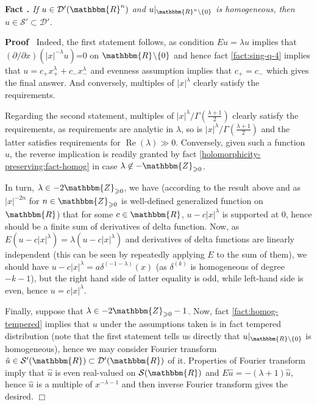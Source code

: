 \documentclass{article}
\newcommand{\nin}{\not\in}
\newcommand{\tmop}[1]{\ensuremath{\operatorname{#1}}}
\newcommand{\tmtextbf}[1]{{\bfseries{#1}}}
\newcommand{\tmtextit}[1]{{\itshape{#1}}}
\newcommand{\tmtextup}[1]{{\upshape{#1}}}
\newenvironment{proof}{\noindent\textbf{Proof\ }}{\hspace*{\fill}$\Box$\medskip}
\numberwithin{definition}{section}
\numberwithin{lemma}{section}
\numberwithin{proposition}{section}
{\theorembodyfont{\rmfamily}\newtheorem{remark}{Remark}
\numberwithin{remark}{section}
}
\begin{document}
{\noindent}\tmtextbf{Fact \tmtextup{15}.
}\tmtextit{\label{fact:homog-tempered}{\cite[thm.
7.1.18]{hormander1983analysis}} If $u \in \mathcal{D}' ( \mathbbm{R}^n)$ and
$u |_{\mathbbm{R}^n \backslash \{ 0 \}}$ is homogeneous, then $u \in
\mathcal{S}' \subset \mathcal{D}'$.}{\hspace*{\fill}}{\medskip}

\begin{proof}
  Indeed, the first statement follows, as condition $E u = \lambda u$ implies
  that $( \partial / \partial x) ( | x |^{- \lambda} u)$=0 on $\mathbbm{R}^{}
  \backslash \{ 0 \}$ and hence fact \ref{fact:sing-q-4} implies that $u = c_+
  x_+^{\lambda} + c_- x_-^{\lambda}$ and evenness assumption implies that $c_+
  = c_-$ which gives the final answer. And conversely, multiples of $| x
  |^{\lambda}$ clearly satisfy the requirements.
  
  Regarding the second statement, multiples of $| x |^{\lambda} / \Gamma
  \left( \frac{\lambda + 1}{2} \right)$ clearly satisfy the requirements, as
  requirements are analytic in $\lambda$, so is $| x |^{\lambda} / \Gamma
  \left( \frac{\lambda + 1}{2} \right)$ and the latter satisfies requirements
  for $\tmop{Re} ( \lambda) \gg 0$. Conversely, given such a function $u$, the
  reverse implication is readily granted by fact
  \ref{holomorphicity-preserving:fact-homog} in case $\lambda \nin
  -\mathbbm{Z}_{\geqslant 0}$.
  
  In turn, $\lambda \in - 2\mathbbm{Z}_{\geqslant 0}$, we have (according to
  the result above and as $| x |^{- 2 n}$ for $n \in \mathbbm{Z}_{\geqslant
  0}$ is well-defined generalized function on $\mathbbm{R}$) that for some $c
  \in \mathbbm{R}$, $u - c | x |^{\lambda}$ is supported at $0$, hence should
  be a finite sum of derivatives of delta function. Now, as $E ( u - c | x
  |^{\lambda}) = \lambda ( u - c | x |^{\lambda})$ and derivatives of delta
  functions are linearly independent (this can be seen by repeatedly applying
  $E$ to the sum of them), we should have $u - c | x |^{\lambda} = a \delta^{(
  - 1 - \lambda)} ( x)$ (as $\delta^{( k)}$ is homogeneous of degree $- k -
  1$), but the right hand side of latter equality is odd, while left-hand side
  is even, hence $u = c | x |^{\lambda}$.
  
  Finally, suppose that $\lambda \in - 2\mathbbm{Z}_{\geqslant 0} - 1$. Now,
  fact \ref{fact:homog-tempered} implies that $u$ under the assumptions taken
  is in fact tempered distribution (note that the first statement tells us
  directly that $u |_{\mathbbm{R}\backslash \{ 0 \}}$ is homogeneous), hence
  we may consider Fourier transform $\hat{u} \in \mathcal{S}' ( \mathbbm{R})
  \subset \mathcal{D}' ( \mathbbm{R})$ of it. Properties of Fourier transform
  imply that $\hat{u}$ is even real-valued on $\mathcal{S} ( \mathbbm{R})$ and
  $E \hat{u} = - ( \lambda + 1) \hat{u}$, hence $\hat{u}$ is a multiple of
  $x^{- \lambda - 1}$ and then inverse Fourier transform gives the desired.
\end{proof}
\end{document}
